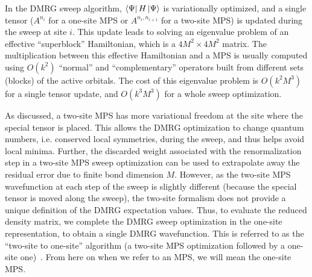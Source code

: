 
In the DMRG sweep algorithm, $\bra{\Psi}H\ket{\Psi}$ is variationally optimized, and  a single tensor ($A^{n_i}$ for a one-site MPS or $A^{n_i, n_{i+1}}$ for a two-site MPS) is updated during the sweep at site $i$. This update leads to solving an eigenvalue problem of an effective ``superblock'' Hamiltonian, 
which is a $4M^2\times 4M^2$ matrix. 
The multiplication between this effective Hamiltonian and a MPS is usually computed using $O(k^2)$ ``normal'' and ``complementary'' operators 
built from different sets (blocks) of the active orbitals. The cost of this eigenvalue problem is $O(k^2M^3)$ for a single tensor update, and $O(k^3M^3)$ 
for a whole sweep optimization. 

As discussed, a two-site MPS has more variational freedom at the site where the special tensor is placed. This allows 
the DMRG optimization to change quantum numbers, i.e. conserved local symmetries, during the sweep, and thus helps avoid local minima. Further,
the discarded weight associated with the renormalization step in a two-site MPS sweep optimization can be used to extrapolate away the residual 
error due to finite bond dimension $M$. 
However, as the two-site MPS wavefunction at each step of the sweep 
is slightly different (because the special tensor is moved along the sweep),
the two-site formalism does not provide a unique definition of the DMRG 
expectation values.
Thus, to evaluate the reduced density matrix, we complete the DMRG
sweep optimization in the one-site representation, to obtain a single 
DMRG wavefunction. This is
referred to as the ``two-site to one-site'' algorithm (a two-site MPS optimization followed by a one-site one)~\cite{olivares-amaya_ab-initio_2015}. 
From here on when we refer to an MPS, we will mean the one-site MPS.



